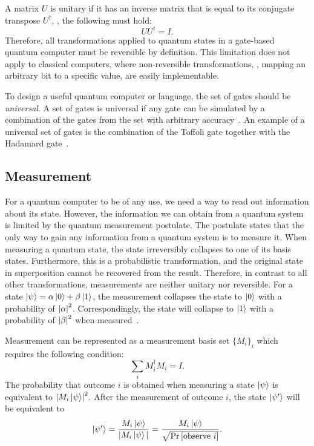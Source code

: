 A matrix $U$ is unitary if it has an inverse matrix that is equal to its conjugate transpose $U^\dagger$, \ie, the following must hold:
\begin{equation*}
    U U^\dagger = I.
\end{equation*}
Therefore, all transformations applied to quantum states in a gate-based quantum computer must be reversible by definition. This limitation does not apply to classical computers, where non-reversible transformations, \eg, mapping an arbitrary bit to a specific value, are easily implementable.

To design a useful quantum computer or language, the set of gates should be \emph{universal}. A set of gates is universal if any gate can be simulated by a combination of the gates from the set with arbitrary accuracy~\cite{BrBr02}. An example of a universal set of gates is the combination of the Toffoli gate together with the Hadamard gate~\cite{DiCh20a}.

\subsection{Measurement}
\label{sec:background_measurement}
For a quantum computer to be of any use, we need a way to read out information about its state. However, the information we can obtain from a quantum system is limited by the quantum measurement postulate. The postulate states that the only way to gain any information from a quantum system is to measure it. When measuring a quantum state, the state irreversibly collapses to one of its basis states.
Furthermore, this is a probabilistic transformation, and the original state in superposition cannot be recovered from the result. Therefore, in contrast to all other transformations, measurements are neither unitary nor reversible. 
For a state $\ket{\psi} = \alpha \ket{0} + \beta \ket{1}$, the measurement collapses the state to $\ket{0}$ with a probability of $\abs{\alpha}^2$. Correspondingly, the state will collapse to $\ket{1}$ with a probability of $\abs{\beta}^2$ when measured~\cite{DiCh20a}.

Measurement can be represented as a measurement basis set $\{M_i\}_i$ which requires the following condition:
\begin{equation*}
    \sum_i M_i^\dagger M_i = I.
\end{equation*}
The probability that outcome $i$ is obtained when measuring a state $\ket{\psi}$ is equivalent to $\abs{M_i \ket{\psi}}^2$. After the measurement of outcome $i$, the state $\ket{\psi'}$ will be equivalent to
\begin{equation*}
    \ket{\psi'} = \frac{M_i \ket{\psi}}{|M_i \ket{\psi}|} = \frac{M_i \ket{\psi}}{\sqrt{\Probability{[\text{observe }i]}}}.
\end{equation*} 

